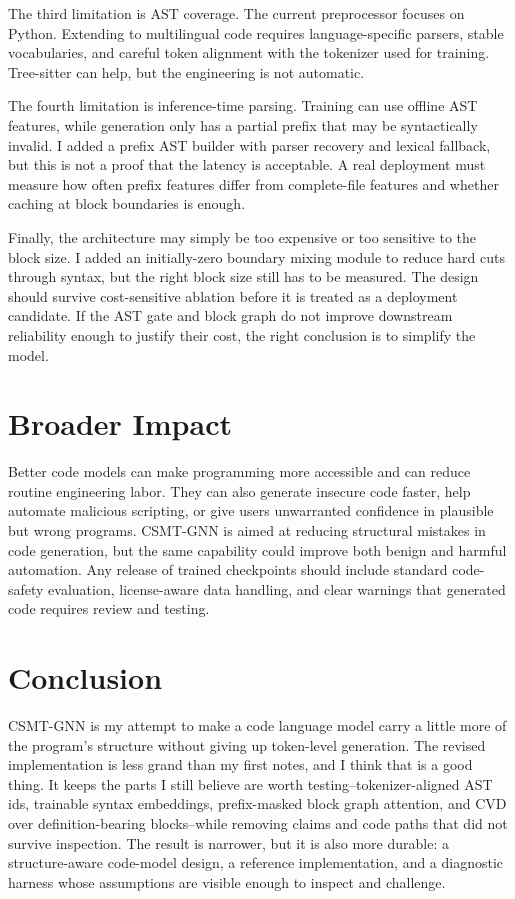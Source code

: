 \documentclass[10pt]{article}
\begin{document}
The third limitation is AST coverage.  The current preprocessor focuses on
Python.  Extending to multilingual code requires language-specific parsers,
stable vocabularies, and careful token alignment with the tokenizer used for
training.  Tree-sitter can help, but the engineering is not automatic.

The fourth limitation is inference-time parsing.  Training can use offline AST
features, while generation only has a partial prefix that may be syntactically
invalid.  I added a prefix AST builder with parser recovery and lexical
fallback, but this is not a proof that the latency is acceptable.  A real
deployment must measure how often prefix features differ from complete-file
features and whether caching at block boundaries is enough.

Finally, the architecture may simply be too expensive or too sensitive to the
block size.  I added an initially-zero boundary mixing module to reduce hard
cuts through syntax, but the right block size still has to be measured.  The
design should survive cost-sensitive ablation before it is treated as a
deployment candidate.  If the AST gate and block graph do not improve downstream
reliability enough to justify their cost, the right conclusion is to simplify
the model.

\section{Broader Impact}

Better code models can make programming more accessible and can reduce routine
engineering labor.  They can also generate insecure code faster, help automate
malicious scripting, or give users unwarranted confidence in plausible but wrong
programs.  CSMT-GNN is aimed at reducing structural mistakes in code generation,
but the same capability could improve both benign and harmful automation.  Any
release of trained checkpoints should include standard code-safety evaluation,
license-aware data handling, and clear warnings that generated code requires
review and testing.

\section{Conclusion}

CSMT-GNN is my attempt to make a code language model carry a little more of the
program's structure without giving up token-level generation.  The revised
implementation is less grand than my first notes, and I think that is a good
thing.  It keeps the parts I still believe are worth testing--tokenizer-aligned
AST ids, trainable syntax embeddings, prefix-masked block graph attention, and
CVD over definition-bearing blocks--while removing claims and code paths that
did not survive inspection.  The result is narrower, but it is also more
durable: a structure-aware code-model design, a reference implementation, and a
diagnostic harness whose assumptions are visible enough to inspect and challenge.
\end{document}
